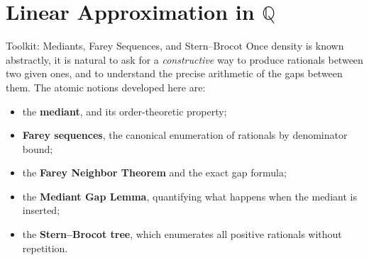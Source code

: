 \section{\texorpdfstring{Linear Approximation in $\mathbb{Q}$}{Linear Approximation in Q}}
\label{sec:linear-approximation-q}

\begin{toolkitbox}{Toolkit: Mediants, Farey Sequences, and Stern--Brocot}
Once density is known abstractly, it is natural to ask for a \emph{constructive}
way to produce rationals between two given ones, and to understand the precise
arithmetic of the gaps between them.  The atomic notions developed here are:
\begin{itemize}
  \item the \textbf{mediant}, and its order-theoretic property;
  \item \textbf{Farey sequences}, the canonical enumeration of rationals by
        denominator bound;
  \item the \textbf{Farey Neighbor Theorem} and the exact gap formula;
  \item the \textbf{Mediant Gap Lemma}, quantifying what happens when the
        mediant is inserted;
  \item the \textbf{Stern--Brocot tree}, which enumerates all positive rationals
        without repetition.
\end{itemize}
\end{toolkitbox}








